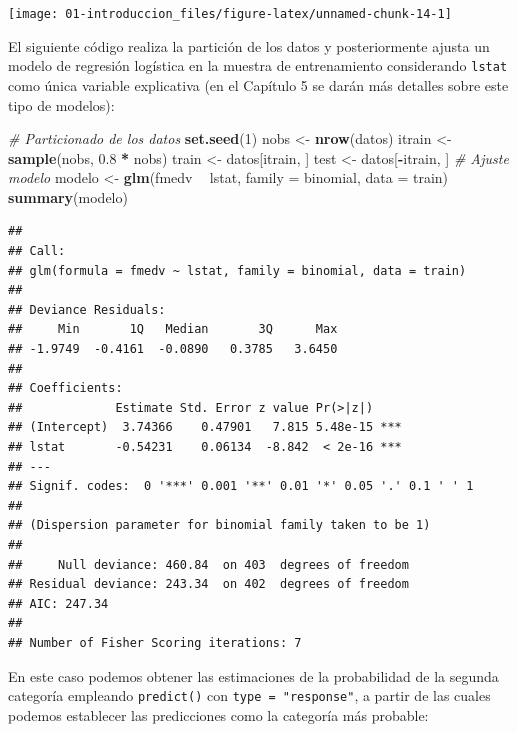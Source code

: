 \documentclass[
]{book}
\newenvironment{Shaded}{\begin{snugshade}}{\end{snugshade}}
\newcommand{\CommentTok}[1]{\textcolor[rgb]{0.56,0.35,0.01}{\textit{#1}}}
\newcommand{\DataTypeTok}[1]{\textcolor[rgb]{0.13,0.29,0.53}{#1}}
\newcommand{\DecValTok}[1]{\textcolor[rgb]{0.00,0.00,0.81}{#1}}
\newcommand{\FloatTok}[1]{\textcolor[rgb]{0.00,0.00,0.81}{#1}}
\newcommand{\KeywordTok}[1]{\textcolor[rgb]{0.13,0.29,0.53}{\textbf{#1}}}
\newcommand{\NormalTok}[1]{#1}
\newcommand{\OperatorTok}[1]{\textcolor[rgb]{0.81,0.36,0.00}{\textbf{#1}}}
\newcommand{\StringTok}[1]{\textcolor[rgb]{0.31,0.60,0.02}{#1}}
\theoremstyle{break}
\theoremstyle{definition}
\theoremstyle{definition}
\theoremstyle{definition}
\theoremstyle{remark}
\begin{document}
\begin{center}\texttt{[image: 01-introduccion\_files/figure-latex/unnamed-chunk-14-1]} \end{center}

El siguiente código realiza la partición de los datos y posteriormente ajusta un modelo de regresión logística en la muestra de entrenamiento considerando \texttt{lstat} como única variable explicativa (en el Capítulo 5 se darán más detalles sobre este tipo de modelos):

\begin{Shaded}
\begin{Highlighting}[]
\CommentTok{# Particionado de los datos}
\KeywordTok{set.seed}\NormalTok{(}\DecValTok{1}\NormalTok{)}
\NormalTok{nobs <-}\StringTok{ }\KeywordTok{nrow}\NormalTok{(datos)}
\NormalTok{itrain <-}\StringTok{ }\KeywordTok{sample}\NormalTok{(nobs, }\FloatTok{0.8} \OperatorTok{*}\StringTok{ }\NormalTok{nobs)}
\NormalTok{train <-}\StringTok{ }\NormalTok{datos[itrain, ]}
\NormalTok{test <-}\StringTok{ }\NormalTok{datos[}\OperatorTok{-}\NormalTok{itrain, ]}
\CommentTok{# Ajuste modelo}
\NormalTok{modelo <-}\StringTok{ }\KeywordTok{glm}\NormalTok{(fmedv }\OperatorTok{~}\StringTok{ }\NormalTok{lstat, }\DataTypeTok{family =}\NormalTok{ binomial, }\DataTypeTok{data =}\NormalTok{ train)}
\KeywordTok{summary}\NormalTok{(modelo)}
\end{Highlighting}
\end{Shaded}

\begin{verbatim}
## 
## Call:
## glm(formula = fmedv ~ lstat, family = binomial, data = train)
## 
## Deviance Residuals: 
##     Min       1Q   Median       3Q      Max  
## -1.9749  -0.4161  -0.0890   0.3785   3.6450  
## 
## Coefficients:
##             Estimate Std. Error z value Pr(>|z|)    
## (Intercept)  3.74366    0.47901   7.815 5.48e-15 ***
## lstat       -0.54231    0.06134  -8.842  < 2e-16 ***
## ---
## Signif. codes:  0 '***' 0.001 '**' 0.01 '*' 0.05 '.' 0.1 ' ' 1
## 
## (Dispersion parameter for binomial family taken to be 1)
## 
##     Null deviance: 460.84  on 403  degrees of freedom
## Residual deviance: 243.34  on 402  degrees of freedom
## AIC: 247.34
## 
## Number of Fisher Scoring iterations: 7
\end{verbatim}

En este caso podemos obtener las estimaciones de la probabilidad de la segunda categoría empleando \texttt{predict()} con \texttt{type\ =\ "response"}, a partir de las cuales podemos establecer las predicciones como la categoría más probable:
\end{document}

